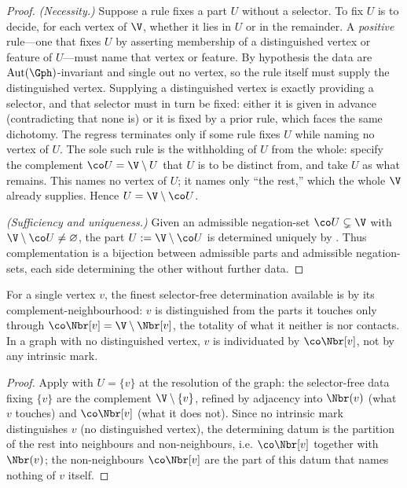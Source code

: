 \begin{proof}
\emph{(Necessity.)} Suppose a rule fixes a part $U$ without a selector. To fix
$U$ is to decide, for each vertex of $\V$, whether it lies in $U$ or in the
remainder. A \emph{positive} rule---one that fixes $U$ by asserting membership of
a distinguished vertex or feature of $U$---must name that vertex or feature. By
hypothesis the data are $\mathrm{Aut}(\Gph)$-invariant and single out no vertex,
so the rule itself must supply the distinguished vertex. Supplying a
distinguished vertex is exactly providing a selector, and that selector must in
turn be fixed: either it is given in advance (contradicting that none is) or it
is fixed by a prior rule, which faces the same dichotomy. The regress terminates
only if some rule fixes $U$ while naming no vertex of $U$. The sole such rule is
the withholding of $U$ from the whole: specify the complement $\co U=\V\setminus
U$ that $U$ is to be distinct from, and take $U$ as what remains. This names no
vertex of $U$; it names only ``the rest,'' which the whole $\V$ already
supplies. Hence $U=\V\setminus\co U$.

\emph{(Sufficiency and uniqueness.)} Given an admissible negation-set
$\co U\subsetneq\V$ with $\V\setminus\co U\neq\varnothing$, the part
$U:=\V\setminus\co U$ is determined uniquely by . Thus
complementation is a bijection between admissible parts and admissible
negation-sets, each side determining the other without further data.
\end{proof}

\begin{corollary}
\label{cor:vertex-negation}
For a single vertex $v$, the finest selector-free determination available is by
its complement-neighbourhood: $v$ is distinguished from the parts it touches
only through $\co\Nbr[v]=\V\setminus\Nbr[v]$, the totality of what it neither is
nor contacts. In a graph with no distinguished vertex, $v$ is individuated by
$\co\Nbr[v]$, not by any intrinsic mark.
\end{corollary}

\begin{proof}
Apply  with $U=\{v\}$ at the resolution of the graph: the
selector-free data fixing $\{v\}$ are the complement
$\V\setminus\{v\}$, refined by adjacency into $\Nbr(v)$ (what $v$ touches) and
$\co\Nbr[v]$ (what it does not). Since no intrinsic mark distinguishes $v$
(no distinguished vertex), the determining datum is the partition of the rest
into neighbours and non-neighbours, i.e. $\co\Nbr[v]$ together with $\Nbr(v)$;
the non-neighbours $\co\Nbr[v]$ are the part of this datum that names nothing of
$v$ itself.
\end{proof}


